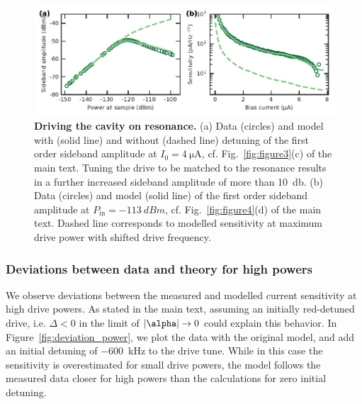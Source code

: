 \begin{figure}
	\centering
	\includegraphics[width=\linewidth]{chapter-currentdetection/figures/SM_Duffing_on_resonance}
	\caption{
		\textbf{Driving the cavity on resonance.}
		(a) Data (circles) and model with (solid line) and without (dashed line) detuning of the first order sideband amplitude at $I_0=\SI{4}{\micro\ampere}$, cf. Fig.~\ref{fig:figure3}(c) of the main text.
		Tuning the drive to be matched to the resonance results in a further increased sideband amplitude of more than \SI{10}{\decibel}.
		(b) Data (circles) and model (solid line) of the first order sideband amplitude at $P_\text{in}=\SI{-113}{dBm}$, cf. Fig.~\ref{fig:figure4}(d) of the main text.
		Dashed line corresponds to modelled sensitivity at maximum drive power with shifted drive frequency.
	}
	\label{fig:Duffing-on-res}
\end{figure}



\subsubsection{Deviations between data and theory for high powers}\label{sec:deviation_power}

We observe deviations between the measured and modelled current sensitivity at high drive powers.
% 
As stated in the main text, assuming an initially red-detuned drive, i.e. $\Delta<0$ in the limit of $\abs{\alpha}\rightarrow 0$ could explain this behavior.
% 
In Figure~\ref{fig:deviation_power}, we plot the data with the original model, and add an initial detuning of \SI{-600}{\kilo\hertz} to the drive tune.
% 
While in this case the sensitivity is overestimated for small drive powers, the model follows the measured data closer for high powers than the calculations for zero initial detuning.

